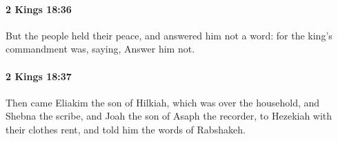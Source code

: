 		\paragraph{2 Kings 18:36} %
			\label{2KINGS-18-36}

			But the people held their peace, and answered him not a word: for the king’s commandment was, saying, Answer him not.


		\paragraph{2 Kings 18:37} %
			\label{2KINGS-18-37}

			Then came Eliakim the son of Hilkiah, which was over the household, and Shebna the scribe, and Joah the son of Asaph the recorder, to Hezekiah with their clothes rent, and told him the words of Rabshakeh.

